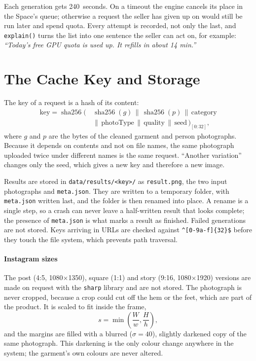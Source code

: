 Each generation gets 240~seconds. On a timeout the engine cancels its place in the Space's queue; otherwise a request the seller has given up on would still be run later and spend quota. Every attempt is recorded, not only the last, and \texttt{explain()} turns the list into one sentence the seller can act on, for example: \emph{``Today's free GPU quota is used up. It refills in about 14 min.''}

\section{The Cache Key and Storage}
\label{sec:cache}

The key of a request is a hash of its content:
\begin{equation}
\begin{aligned}
\text{key} = \operatorname{sha256}\big(\, & \operatorname{sha256}(g) \,\|\, \operatorname{sha256}(p) \,\|\, \text{category} \\
& \|\, \text{photoType} \,\|\, \text{quality} \,\|\, \text{seed} \,\big)_{[0:32]},
\end{aligned}
\end{equation}
where $g$ and $p$ are the bytes of the cleaned garment and person photographs. Because it depends on contents and not on file names, the same photograph uploaded twice under different names is the same request. ``Another variation'' changes only the seed, which gives a new key and therefore a new image.

Results are stored in \texttt{data/results/<key>/} as \texttt{result.png}, the two input photographs and \texttt{meta.json}. They are written to a temporary folder, with \texttt{meta.json} written last, and the folder is then renamed into place. A rename is a single step, so a crash can never leave a half-written result that looks complete; the presence of \texttt{meta.json} is what marks a result as finished. Failed generations are not stored. Keys arriving in URLs are checked against \verb|^[0-9a-f]{32}$| before they touch the file system, which prevents path traversal.

\paragraph{Instagram sizes} The post (4:5, 1080$\times$1350), square (1:1) and story (9:16, 1080$\times$1920) versions are made on request with the \texttt{sharp} library and are not stored. The photograph is never cropped, because a crop could cut off the hem or the feet, which are part of the product. It is scaled to fit inside the frame,
\begin{equation}
s = \min\!\left(\frac{W}{w}, \frac{H}{h}\right),
\end{equation}
and the margins are filled with a blurred ($\sigma = 40$), slightly darkened copy of the same photograph. This darkening is the only colour change anywhere in the system; the garment's own colours are never altered.

